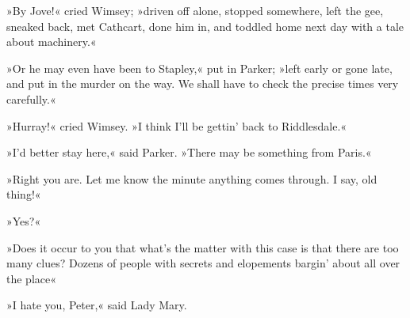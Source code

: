 »By Jove!« cried Wimsey; »driven off alone, stopped somewhere, left the gee, sneaked back, met Cathcart, done him in, and toddled home next day with a tale about machinery.«

»Or he may even have been to Stapley,« put in Parker; »left early or gone late, and put in the murder on the way. We shall have to check the precise times very carefully.«

»Hurray!« cried Wimsey. »I think I'll be gettin' back to Riddlesdale.«

»I'd better stay here,« said Parker. »There may be something from Paris.«

»Right you are. Let me know the minute anything comes through. I say, old thing!«

\makeatletter
{}
{%
	\enlargethispage{\baselineskip}
}{%
}
\makeatother

»Yes?«

»Does it occur to you that what's the matter with this case is that there are too many clues? Dozens of people with secrets and elopements bargin' about all over the place\longdash«

»I hate you, Peter,« said Lady Mary.
